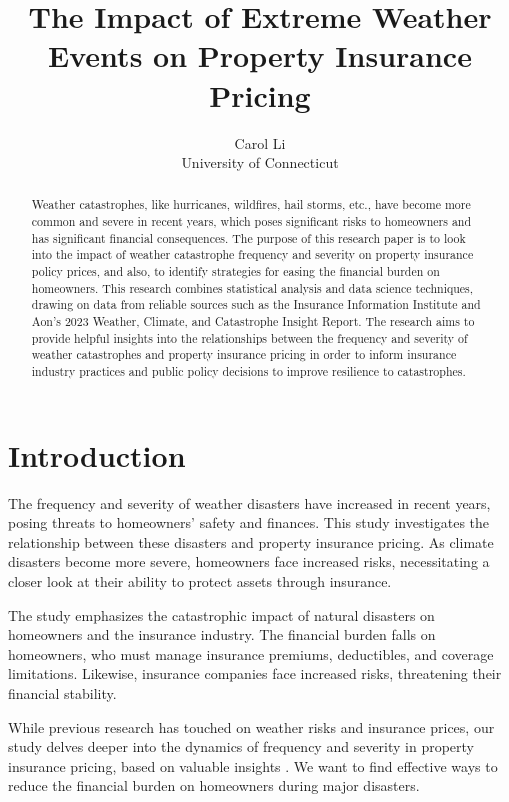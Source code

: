 \documentclass[12pt]{article}
\title{The Impact of Extreme Weather Events on Property Insurance Pricing}
\author{Carol Li\\
    University of Connecticut
}
\begin{document}
\maketitle

\begin{abstract}
Weather catastrophes, like hurricanes, wildfires, hail storms, etc., have become more common and severe in recent years, which poses 
significant risks to homeowners and has significant financial consequences. The purpose of this research paper is to look into the 
impact of weather catastrophe frequency and severity on property insurance policy prices, and also, to identify strategies for easing 
the financial burden on homeowners. This research combines statistical analysis and data science techniques, drawing on data from 
reliable sources such as the Insurance Information Institute and Aon's 2023 Weather, Climate, and Catastrophe Insight Report. The 
research aims to provide helpful insights into the relationships between the frequency and severity of weather catastrophes and 
property insurance pricing in order to inform insurance industry practices and public policy decisions to improve resilience to 
catastrophes.
\end{abstract}


\section{Introduction}
\label{sec:intro}
The frequency and severity of weather disasters have increased in recent years, posing threats to homeowners' safety and finances. 
This study investigates the relationship between these disasters and property insurance pricing. As climate disasters become more 
severe, homeowners face increased risks, necessitating a closer look at their ability to protect assets through insurance.

The study emphasizes the catastrophic impact of natural disasters on homeowners and the insurance industry. The financial burden 
falls on homeowners, who must manage insurance premiums, deductibles, and coverage limitations. Likewise, insurance companies face 
increased risks, threatening their financial stability.

While previous research has touched on weather risks and insurance prices, our study delves deeper into the dynamics of frequency and 
severity in property insurance pricing, based on valuable insights \cite{hurricaneeco}. We want to find effective ways to reduce the financial burden 
on homeowners during major disasters.
\end{document}
